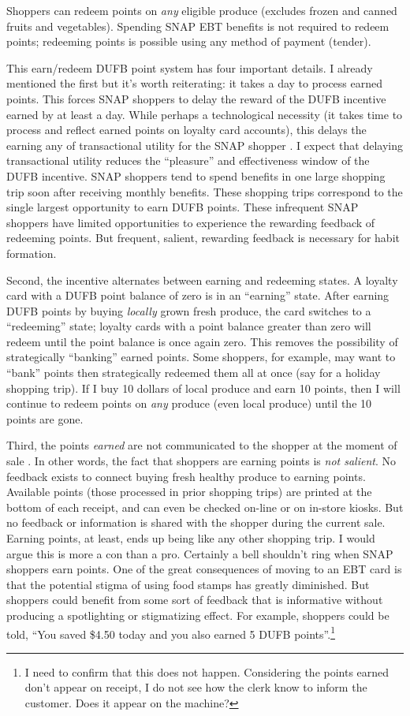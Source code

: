 \documentclass[12pt,letterpaperpaper,]{book}
\begin{document}
Shoppers can redeem points on \emph{any} eligible produce (excludes
frozen and canned fruits and vegetables). Spending SNAP EBT benefits is
not required to redeem points; redeeming points is possible using any
method of payment (tender).

This earn/redeem DUFB point system has four important details. I already
mentioned the first but it's worth reiterating: it takes a day to
process earned points. This forces SNAP shoppers to delay the reward of
the DUFB incentive earned by at least a day. While perhaps a
technological necessity (it takes time to process and reflect earned
points on loyalty card accounts), this delays the earning any of
transactional utility for the SNAP shopper \citep{thaler_mental_1985}. I
expect that delaying transactional utility reduces the ``pleasure'' and
effectiveness window of the DUFB incentive. SNAP shoppers tend to spend
benefits in one large shopping trip soon after receiving monthly
benefits. These shopping trips correspond to the single largest
opportunity to earn DUFB points. These infrequent SNAP shoppers have
limited opportunities to experience the rewarding feedback of redeeming
points. But frequent, salient, rewarding feedback is necessary for habit
formation.

Second, the incentive alternates between earning and redeeming states. A
loyalty card with a DUFB point balance of zero is in an ``earning''
state. After earning DUFB points by buying \emph{locally} grown fresh
produce, the card switches to a ``redeeming'' state; loyalty cards with
a point balance greater than zero will redeem until the point balance is
once again zero. This removes the possibility of strategically
``banking'' earned points. Some shoppers, for example, may want to
``bank'' points then strategically redeemed them all at once (say for a
holiday shopping trip). If I buy 10 dollars of local produce and earn 10
points, then I will continue to redeem points on \emph{any} produce
(even local produce) until the 10 points are gone.

Third, the points \emph{earned} are not communicated to the shopper at
the moment of sale \citep{family_fare_double_2016}. In other words, the
fact that shoppers are earning points is \emph{not salient}. No feedback
exists to connect buying fresh healthy produce to earning points.
Available points (those processed in prior shopping trips) are printed
at the bottom of each receipt, and can even be checked on-line or on
in-store kiosks. But no feedback or information is shared with the
shopper during the current sale. Earning points, at least, ends up being
like any other shopping trip. I would argue this is more a con than a
pro. Certainly a bell shouldn't ring when SNAP shoppers earn points. One
of the great consequences of moving to an EBT card is that the potential
stigma of using food stamps has greatly diminished. But shoppers could
benefit from some sort of feedback that is informative without producing
a spotlighting or stigmatizing effect. For example, shoppers could be
told, ``You saved \$4.50 today and you also earned 5 DUFB
points''.\footnote{I need to confirm that this does not happen.
  Considering the points earned don't appear on receipt, I do not see
  how the clerk know to inform the customer. Does it appear on the
  machine?}
\end{document}
